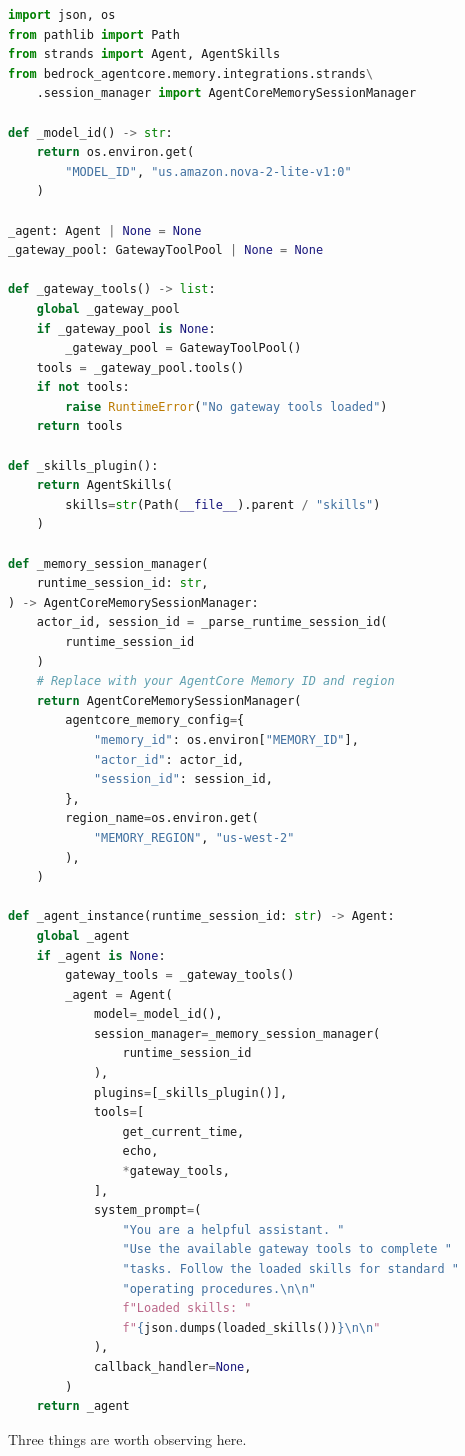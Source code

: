 \begin{lstlisting}[language=Python]
import json, os
from pathlib import Path
from strands import Agent, AgentSkills
from bedrock_agentcore.memory.integrations.strands\
    .session_manager import AgentCoreMemorySessionManager

def _model_id() -> str:
    return os.environ.get(
        "MODEL_ID", "us.amazon.nova-2-lite-v1:0"
    )

_agent: Agent | None = None
_gateway_pool: GatewayToolPool | None = None

def _gateway_tools() -> list:
    global _gateway_pool
    if _gateway_pool is None:
        _gateway_pool = GatewayToolPool()
    tools = _gateway_pool.tools()
    if not tools:
        raise RuntimeError("No gateway tools loaded")
    return tools

def _skills_plugin():
    return AgentSkills(
        skills=str(Path(__file__).parent / "skills")
    )

def _memory_session_manager(
    runtime_session_id: str,
) -> AgentCoreMemorySessionManager:
    actor_id, session_id = _parse_runtime_session_id(
        runtime_session_id
    )
    # Replace with your AgentCore Memory ID and region
    return AgentCoreMemorySessionManager(
        agentcore_memory_config={
            "memory_id": os.environ["MEMORY_ID"],
            "actor_id": actor_id,
            "session_id": session_id,
        },
        region_name=os.environ.get(
            "MEMORY_REGION", "us-west-2"
        ),
    )

def _agent_instance(runtime_session_id: str) -> Agent:
    global _agent
    if _agent is None:
        gateway_tools = _gateway_tools()
        _agent = Agent(
            model=_model_id(),
            session_manager=_memory_session_manager(
                runtime_session_id
            ),
            plugins=[_skills_plugin()],
            tools=[
                get_current_time,
                echo,
                *gateway_tools,
            ],
            system_prompt=(
                "You are a helpful assistant. "
                "Use the available gateway tools to complete "
                "tasks. Follow the loaded skills for standard "
                "operating procedures.\n\n"
                f"Loaded skills: "
                f"{json.dumps(loaded_skills())}\n\n"
            ),
            callback_handler=None,
        )
    return _agent
\end{lstlisting}

Three things are worth observing here.

